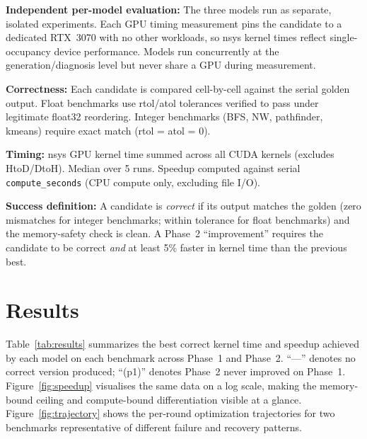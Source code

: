 \documentclass[conference]{IEEEtran}
\begin{document}
\textbf{Independent per-model evaluation:} The three models run as separate,
isolated experiments. Each GPU timing measurement pins the candidate to a
dedicated RTX~3070 with no other workloads, so nsys kernel times reflect
single-occupancy device performance. Models run concurrently at the
generation/diagnosis level but never share a GPU during measurement.

\textbf{Correctness:} Each candidate is compared cell-by-cell against the
serial golden output. Float benchmarks use rtol/atol tolerances verified to
pass under legitimate float32 reordering. Integer benchmarks (BFS, NW,
pathfinder, kmeans) require exact match (rtol = atol = 0).

\textbf{Timing:} nsys GPU kernel time summed across all CUDA kernels (excludes
HtoD/DtoH). Median over 5 runs. Speedup computed against serial
\texttt{compute\_seconds} (CPU compute only, excluding file I/O).

\textbf{Success definition:} A candidate is \emph{correct} if its output
matches the golden (zero mismatches for integer benchmarks; within tolerance
for float benchmarks) and the memory-safety check is clean. A Phase~2
``improvement'' requires the candidate to be correct \emph{and} at least 5\%
faster in kernel time than the previous best.

\section{Results}

Table~\ref{tab:results} summarizes the best correct kernel time and speedup
achieved by each model on each benchmark across Phase~1 and Phase~2.
``---'' denotes no correct version produced; ``(p1)'' denotes Phase~2 never
improved on Phase~1. Figure~\ref{fig:speedup} visualises the same data on a
log scale, making the memory-bound ceiling and compute-bound differentiation
visible at a glance. Figure~\ref{fig:trajectory} shows the per-round
optimization trajectories for two benchmarks representative of different
failure and recovery patterns.
\end{document}
